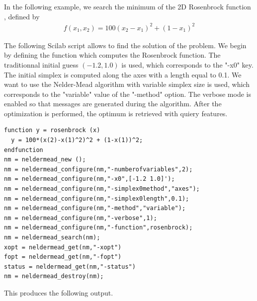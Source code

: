 In the following example, we search the minimum of the 2D Rosenbrock function \cite{citeulike:1903787}, 
defined by
\begin{eqnarray}
f(x_1,x_2) = 100(x_2 - x_1)^2 + (1-x_1)^2
\end{eqnarray}

The following Scilab script allows to find the solution of the problem. 
We begin by defining the function  which computes the Rosenbrock function. 
The traditionnal initial guess $(-1.2 , 1.0)$ is used, which corresponds 
to the "-x0" key. The initial simplex is computed along 
the axes with a length equal to 0.1. We want to use the Nelder-Mead algorithm with variable simplex size 
is used, which corresponds to the "variable" value of the "-method" option. 
The verbose mode is enabled so that messages are generated during the algorithm. 
After the optimization is performed, the optimum is retrieved with quiery features.

\lstset{language=scilabscript}
\begin{lstlisting}
function y = rosenbrock (x)
  y = 100*(x(2)-x(1)^2)^2 + (1-x(1))^2;
endfunction
nm = neldermead_new ();
nm = neldermead_configure(nm,"-numberofvariables",2);
nm = neldermead_configure(nm,"-x0",[-1.2 1.0]');
nm = neldermead_configure(nm,"-simplex0method","axes");
nm = neldermead_configure(nm,"-simplex0length",0.1);
nm = neldermead_configure(nm,"-method","variable");
nm = neldermead_configure(nm,"-verbose",1);
nm = neldermead_configure(nm,"-function",rosenbrock);
nm = neldermead_search(nm);
xopt = neldermead_get(nm,"-xopt")
fopt = neldermead_get(nm,"-fopt")
status = neldermead_get(nm,"-status")
nm = neldermead_destroy(nm);
\end{lstlisting}

This produces the following output.

